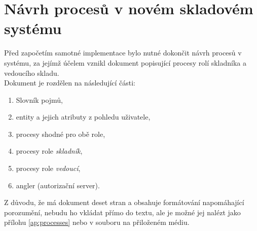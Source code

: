 \section{Návrh procesů v novém skladovém systému}

Před započetím samotné implementace bylo nutné dokončit návrh procesů v systému, za jejímž účelem vznikl dokument popisující procesy rolí skladníka a vedoucího skladu.\\
Dokument je rozdělen na následující části:
\begin{enumerate}
	\item Slovník pojmů,
	\item entity a jejich atributy z pohledu uživatele,
	\item procesy shodné pro obě role,
	\item procesy role \emph{skladník},
	\item procesy role \emph{vedoucí},
	\item angler (autorizační server).
\end{enumerate}
Z důvodu, že má dokument deset stran a obsahuje formátování napomáhající porozumění, nebudu ho vkládat přímo do textu, ale je možné jej nalézt jako přílohu \ref{ap:processes} nebo v souboru  na přiloženém médiu.
